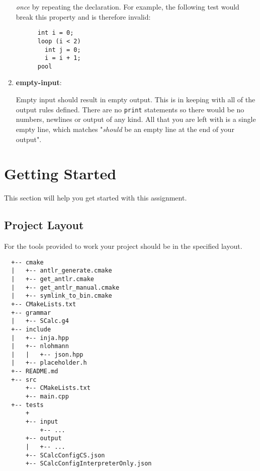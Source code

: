 \documentclass{article}
\newcommand{\code}[1]{\texttt{\textmd{#1}}}
\newcommand{\clarificationdest}[1]{\hypertarget{#1}{\textbf{#1}:}}
\begin{document}
\begin{enumerate}
{    \textit{once}} by repeating the declaration. For example, the following test would break this
    property and is therefore invalid:
    \begin{lstlisting}
      int i = 0;
      loop (i < 2)
        int j = 0;
        i = i + 1;
      pool
    \end{lstlisting}
  \item
    \clarificationdest{empty-input}
    Empty input should result in empty output. This is in keeping with all of the output rules
    defined. There are no \code{print} statements so there would be no numbers, newlines or output
    of any kind. All that you are left with is a single empty line, which matches "\textit{should}
    be an empty line at the end of your output".
\end{enumerate}

\section{Getting Started}
This section will help you get started with this assignment.

\subsection{Project Layout}
For the tools provided to work your project should be in the specified layout.

\begin{lstlisting}
  +-- cmake
  |   +-- antlr_generate.cmake
  |   +-- get_antlr.cmake
  |   +-- get_antlr_manual.cmake
  |   +-- symlink_to_bin.cmake
  +-- CMakeLists.txt
  +-- grammar
  |   +-- SCalc.g4
  +-- include
  |   +-- inja.hpp
  |   +-- nlohmann
  |   |   +-- json.hpp
  |   +-- placeholder.h
  +-- README.md
  +-- src
      +-- CMakeLists.txt
      +-- main.cpp
  +-- tests
      +
      +-- input
          +-- ...
      +-- output
      |   +-- ...
      +-- SCalcConfigCS.json
      +-- SCalcConfigInterpreterOnly.json
\end{lstlisting}
\end{document}
